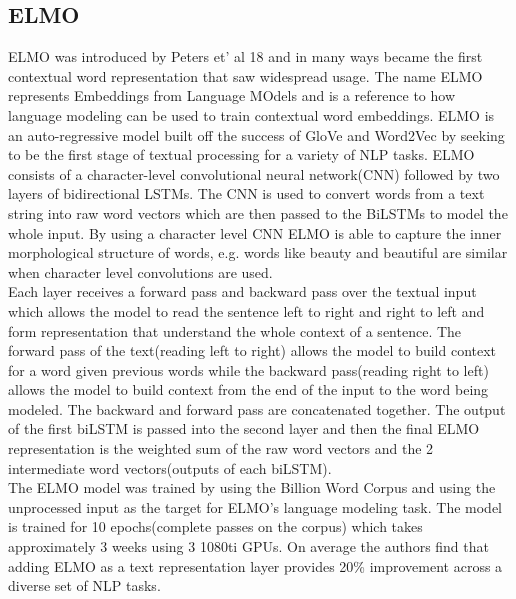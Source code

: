 \subsection{ELMO}
ELMO was introduced by Peters et' al 18 \cite{Peters2018DeepCW} and in many ways became the first contextual word representation that saw widespread usage. The name ELMO represents Embeddings from Language MOdels and is a reference to how language modeling can be used to train contextual word embeddings. ELMO is an auto-regressive model built off the success of GloVe \cite{Pennington2014GloveGV} and Word2Vec \cite{Mikolov2013EfficientEO} by seeking to be the first stage of textual processing for a variety of NLP tasks. ELMO consists of a character-level convolutional neural network(CNN) followed by two layers of bidirectional LSTMs. The CNN is used to convert words from a text string into raw word vectors which are then passed to the BiLSTMs to model the whole input. By using a character level CNN ELMO is able to capture the inner morphological structure of words, e.g. words like beauty and beautiful are similar when character level convolutions are used.\\
Each layer receives a forward pass and backward pass over the textual input which allows the model to read the sentence left to right and right to left and form representation that understand the whole context of a sentence. The forward pass of the text(reading left to right) allows the model to build context for a word given previous words while the backward pass(reading right to left) allows the model to build context from the end of the input to the word being modeled. The backward and forward pass are concatenated together. The output of the first biLSTM is passed into the second layer and then the final ELMO representation is the weighted sum of the raw word vectors and the 2 intermediate word vectors(outputs of each biLSTM).\\ 
The ELMO model was trained by using the Billion Word Corpus \cite{Chelba2014OneBW} and using the unprocessed input as the target for ELMO's language modeling task. The model is trained for 10 epochs(complete passes on the corpus) which takes approximately 3 weeks using 3 1080ti GPUs. On average the authors find that adding ELMO as a text representation layer provides 20\% improvement across a diverse set of NLP tasks.
